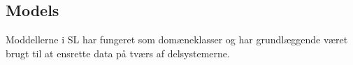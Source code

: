 \subsection{Models}
Moddellerne i \gls{SL} har fungeret som domæneklasser og har grundlæggende været brugt til at ensrette data på tværs af delsystemerne.


